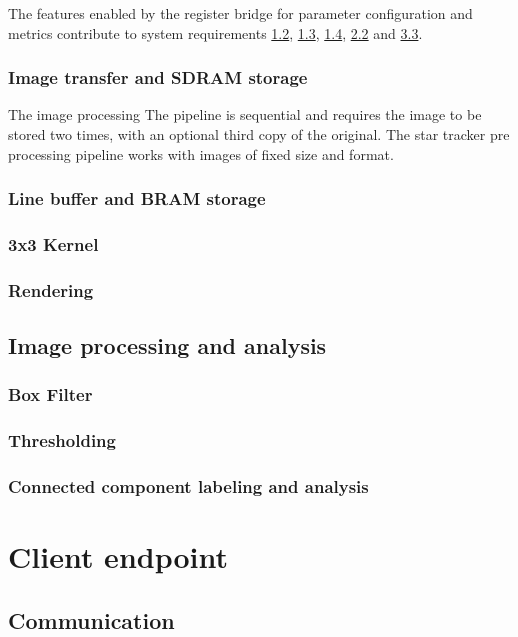 \documentclass[12pt]{report}
\begin{document}
The features enabled by the register bridge for parameter configuration and metrics contribute to system requirements \hyperref[req1.2]{1.2}, \hyperref[req1.3]{1.3}, \hyperref[req1.4]{1.4}, \hyperref[req2.2]{2.2} and \hyperref[req3.3]{3.3}.

\subsubsection{Image transfer and SDRAM storage}
The image processing 
The pipeline is sequential and requires the image to be stored two times, with an optional third copy of the original. 
The star tracker pre processing pipeline works with images of fixed size and format.  

\subsubsection{Line buffer and BRAM storage}

\subsubsection{3x3 Kernel}

\subsubsection{Rendering}

\subsection{Image processing and analysis}
\subsubsection{Box Filter}
\subsubsection{Thresholding}
\subsubsection{Connected component labeling and analysis}

\section{Client endpoint}
\subsection{Communication}
\end{document}
